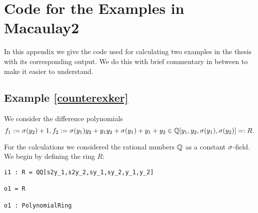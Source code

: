 



\section{Code for the Examples in Macaulay2}\label{appendixcode}

In this appendix we give the code used for calculating two examples in the thesis with its corresponding output. We do this with brief commentary in between to make it easier to understand.

\subsection{Example \ref{counterexker}}
We consider the difference polynomials $$f_1 := \sigma(y_2) + 1, f_2:= \sigma(y_1)y_2 + y_1y_2 + \sigma(y_1) + y_1 + y_2 \in \mathbb{Q}[y_1,y_2,\sigma(y_1),\sigma(y_2)] =: R.$$

For the calculations we considered the rational numbers $\mathbb{Q}$ as a constant $\sigma$-field. We begin by defining the ring $R$:

\begin{lstlisting}
i1 : R = QQ[s2y_1,s2y_2,sy_1,sy_2,y_1,y_2]

o1 = R

o1 : PolynomialRing

\end{lstlisting}

